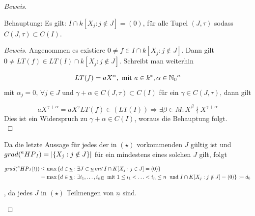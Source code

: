 \documentclass{article}
\newcommand*{\indx}[2]{{#1}_{#2}}
\newcommand*{\potx}[2]{{#1}^{#2}}
\newcommand*{\N}{\mathbb{N}_0}
\newcommand*{\hp}[1]{$\prescript{a}{}{HP}_{#1}$}
\begin{document}
\begin{proof}[Beweis]
\begin{compactenum}
Behauptung: Es gilt: $I\cap k\left[\indx{X}{j}:j\notin J\right]={(0)}$, für alle Tupel $(J,\tau)$ sodass $C(J,\tau)\subset C(I)$.\\

\begin{proof}[Beweis]
	Angenommen es existiere $ 0\neq f\in I\cap k\left[\indx{X}{j}:j\notin J\right]$. Dann gilt 
	$ 0\neq LT(f)\in LT(I)\cap k\left[\indx{X}{j}:j\notin J\right]$. Schreibt man weiterhin
	
	\begin{displaymath}
	LT(f)=a\potx{X}{\alpha}, \textnormal{ mit } a\in\potx{k}{*}, \alpha\in\potx{\N}{n} 
	\end{displaymath}
	mit  $\indx{\alpha}{j}=0, \,\forall j\in J$ und $\gamma+\alpha \in C(J,\tau)\subset C(I)$ für ein $\gamma\in C(J,\tau)$, dann gilt 
	
	\begin{displaymath}
	a\potx{X}{\gamma+\alpha}=a\potx{X}{\gamma}LT(f)\in(LT(I))\Rightarrow\exists\beta\in M:\potx{X}{\beta}\nmid\potx{X}{\gamma+\alpha}
	\end{displaymath}
Dies ist  ein Widerspruch zu $\gamma+\alpha\in C(I)$, woraus die Behauptung folgt. \\
\end{proof} 
Da die letzte Aussage für jedes der in $(\star)$ vorkommenden $J$ gültig ist und $grad(\textnormal{\hp{I}})=\left|\{\indx{X}{j}:j\notin J\}\right|$ für ein mindestens eines solchen $J$ gilt, folgt

\begin{align*}
grad(\textnormal{\hp{I}}(t))&\leq \max{\{d\in\underline{n}:\exists J\subset\underline{n}\, mit\,I\cap K[\indx{X}{j}:j\in J]=(0)\}}\\&
= \max{\{d\in\underline{n}:\exists \indx{i}{1},\ldots,\indx{i}{n}\underline{n}\; \textnormal{ mit }  1\leq\indx{i}{1}<\ldots<\indx{i}{n}\leq n\;\textnormal{ und }I\cap K[\indx{X}{j}:j\notin J]=(0)\}}:=\indx{d}{0}
\end{align*}

, da jedes $J$ in $(\star)$ Teilmengen von $\underline{n}$ sind.


\end{compactenum}
\end{proof}
\end{document}
